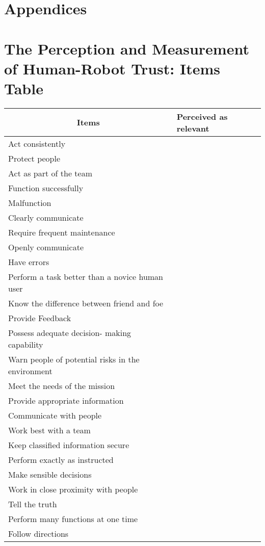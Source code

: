 \section*{Appendices}
\section{The Perception and Measurement of Human-Robot Trust: Items Table}
\begin{longtable}{l|l}
	\multicolumn{1}{c|}{\textbf{Items}} & \textbf{Perceived as relevant} \\ \hline
	\endhead
	Act consistently & \\ \hline
	Protect people & \\ \hline
	Act as part of the team & \\ \hline
	Function successfully & \\ \hline
	Malfunction & \\ \hline
	Clearly communicate & \\ \hline
	Require frequent maintenance & \\ \hline
	Openly communicate & \\ \hline
	Have errors & \\ \hline
	Perform a task better than a novice human user & \\ \hline
	Know the difference between friend and foe & \\ \hline
	Provide Feedback & \\ \hline
	Possess adequate decision- making capability & \\ \hline
	Warn people of potential risks in the environment & \\ \hline
	Meet the needs of the mission & \\ \hline
	Provide appropriate information & \\ \hline
	Communicate with people & \\ \hline
	Work best with a team & \\ \hline
	Keep classified information secure & \\ \hline
	Perform exactly as instructed & \\ \hline
	Make sensible decisions & \\ \hline
	Work in close proximity with people & \\ \hline
	Tell the truth & \\ \hline
	Perform many functions at one time & \\ \hline
	Follow directions & \\ \hline

\end{longtable}
